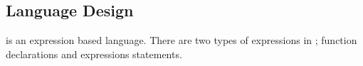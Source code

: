 \subsection{Language Design}

\lang{} is an expression based language. There are two types of expressions in
\lang{}; function declarations and expressions statements. 

\subsubsection {}
